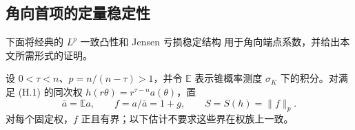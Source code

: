 \subsection{角向首项的定量稳定性}\label{subsec:angular-stability}

下面将经典的 $L^p$ 一致凸性和 Jensen 亏损稳定结构
\cite{BallCarlenLieb1994,Nguyen2015}用于角向端点系数，并给出本文所需形式的证明。

设 $0<\tau<n$、$p=n/(n-\tau)>1$，并令 $\mathbb E$ 表示锥概率测度
$\sigma_K$ 下的积分。对满足 \textup{(H.1)} 的同次权
\(h(r\theta)=r^{\tau-n}a(\theta)\)，置
\[
 \bar a=\mathbb Ea,\qquad f=a/\bar a=1+g,\qquad S=S(h)=\|f\|_p.
 \tag{ST.1}
\]
对每个固定权，$f$ 正且有界；以下估计不要求这些界在权族上一致。

